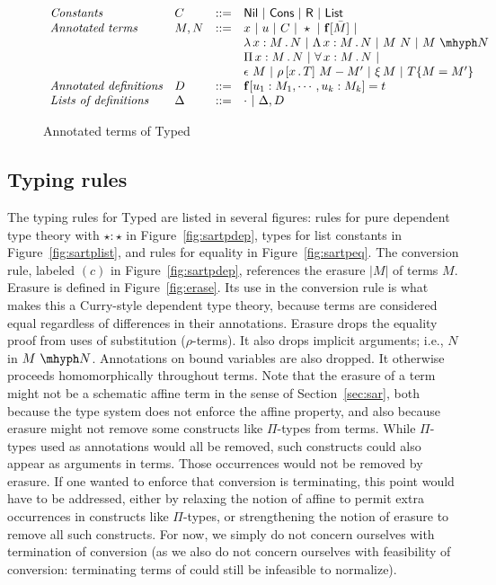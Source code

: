 \documentclass{article}
\begin{document}
\begin{figure}
  \[
  \begin{array}{llll}
    \textit{Constants} & C & ::= &  \mathsf{Nil}\ |\ \mathsf{Cons}\ |\ \mathsf{R}\ |\ \mathsf{List} \\
    \textit{Annotated terms} & M, N & ::= &
    x\ |\ u\ |\ C\ |\ \star\ |\ \mathbf{f}[\bar{M}]\ |\\
    \ &\ &\ & \tlam{x}{M}{N}\ |\ \Tlam{x}{M}{N}\ |\ M\ N\ |\ \appe{M}{N}\\
    \ &\ &\ & \Pia{x}{M}{N}\ |\ \allt{x}{M}{N}\ |\\    
    \ &\ &\ & \rfl{M}\ |\ \cng{x}{T}{M}{M'}\ |\ \ext{M}\ |\ \eqtm{M}{T}{M'} \\
    \textit{Annotated definitions} & D & ::= & \mathbf{f}[u_1:M_1,\cdots,u_k:M_k] = t \\
    \textit{Lists of definitions} & \Delta & ::= & \cdot \ |\ \Delta, D
  \end{array}
  \]
  \caption{Annotated terms of Typed \sar}
  \label{fig:annotm}
\end{figure}

\subsection{Typing rules}

The typing rules for Typed \sar are listed in several figures: rules
for pure dependent type theory with $\star : \star$ in
Figure~\ref{fig:sartpdep}, types for list constants in
Figure~\ref{fig:sartplist}, and rules for equality in
Figure~\ref{fig:sartpeq}.  The conversion rule, labeled $(c)$ in
Figure~\ref{fig:sartpdep}, references the erasure $|M|$ of terms $M$.
Erasure is defined in Figure~\ref{fig:erase}.  Its use in the
conversion rule is what makes this a Curry-style dependent type
theory, because terms are considered equal regardless of differences
in their annotations.  Erasure drops the equality proof from uses of
substitution ($\rho$-terms).  It also drops implicit arguments; i.e.,
$N$ in $\appe{M}{N}$.  Annotations on bound variables are also
dropped.  It otherwise proceeds homomorphically throughout terms.
Note that the erasure of a term might not be a schematic affine term
in the sense of Section~\ref{sec:sar}, both because the type system
does not enforce the affine property, and also because erasure might
not remove some constructs like $\Pi$-types from terms.  While
$\Pi$-types used as annotations would all be removed, such constructs
could also appear as arguments in terms.  Those occurrences would not
be removed by erasure.  If one wanted to enforce that conversion is
terminating, this point would have to be addressed, either by relaxing
the notion of affine to permit extra occurrences in constructs like
$\Pi$-types, or strengthening the notion of erasure to remove all such
constructs.  For now, we simply do not concern ourselves with
termination of conversion (as we also do not concern ourselves with
feasibility of conversion: terminating terms of \sar could still be
infeasible to normalize).  
\end{document}
